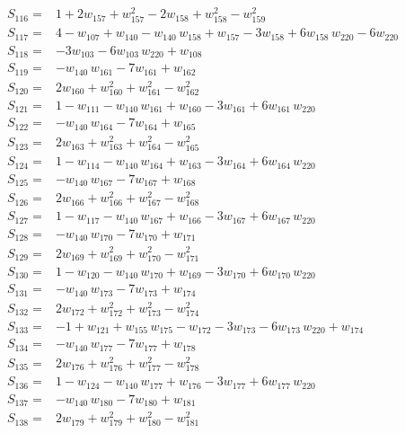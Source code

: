\documentclass[11pt]{article}
\theoremstyle{remark}\newtheorem{remark}[theorem]{Remark}
\begin{document}
\begin{align*}
S_{116}={}& 1 + 2w_{157} + w_{157}^{2} - 2w_{158} + w_{158}^{2} - w_{159}^{2} \\[2pt]
S_{117}={}& 4 - w_{107} + w_{140} - w_{140}\,w_{158} + w_{157} - 3w_{158} + 6w_{158}\,w_{220} - 6w_{220} \\[2pt]
S_{118}={}& -3w_{103} - 6w_{103}\,w_{220} + w_{108} \\[2pt]
S_{119}={}& -w_{140}\,w_{161} - 7w_{161} + w_{162} \\[2pt]
S_{120}={}& 2w_{160} + w_{160}^{2} + w_{161}^{2} - w_{162}^{2} \\[2pt]
S_{121}={}& 1 - w_{111} - w_{140}\,w_{161} + w_{160} - 3w_{161} + 6w_{161}\,w_{220} \\[2pt]
S_{122}={}& -w_{140}\,w_{164} - 7w_{164} + w_{165} \\[2pt]
S_{123}={}& 2w_{163} + w_{163}^{2} + w_{164}^{2} - w_{165}^{2} \\[2pt]
S_{124}={}& 1 - w_{114} - w_{140}\,w_{164} + w_{163} - 3w_{164} + 6w_{164}\,w_{220} \\[2pt]
S_{125}={}& -w_{140}\,w_{167} - 7w_{167} + w_{168} \\[2pt]
S_{126}={}& 2w_{166} + w_{166}^{2} + w_{167}^{2} - w_{168}^{2} \\[2pt]
S_{127}={}& 1 - w_{117} - w_{140}\,w_{167} + w_{166} - 3w_{167} + 6w_{167}\,w_{220} \\[2pt]
S_{128}={}& -w_{140}\,w_{170} - 7w_{170} + w_{171} \\[2pt]
S_{129}={}& 2w_{169} + w_{169}^{2} + w_{170}^{2} - w_{171}^{2} \\[2pt]
S_{130}={}& 1 - w_{120} - w_{140}\,w_{170} + w_{169} - 3w_{170} + 6w_{170}\,w_{220} \\[2pt]
S_{131}={}& -w_{140}\,w_{173} - 7w_{173} + w_{174} \\[2pt]
S_{132}={}& 2w_{172} + w_{172}^{2} + w_{173}^{2} - w_{174}^{2} \\[2pt]
S_{133}={}& -1 + w_{121} + w_{155}\,w_{175} - w_{172} - 3w_{173} - 6w_{173}\,w_{220} + w_{174} \\[2pt]
S_{134}={}& -w_{140}\,w_{177} - 7w_{177} + w_{178} \\[2pt]
S_{135}={}& 2w_{176} + w_{176}^{2} + w_{177}^{2} - w_{178}^{2} \\[2pt]
S_{136}={}& 1 - w_{124} - w_{140}\,w_{177} + w_{176} - 3w_{177} + 6w_{177}\,w_{220} \\[2pt]
S_{137}={}& -w_{140}\,w_{180} - 7w_{180} + w_{181} \\[2pt]
S_{138}={}& 2w_{179} + w_{179}^{2} + w_{180}^{2} - w_{181}^{2} \\[2pt]

\end{align*}
\end{document}
